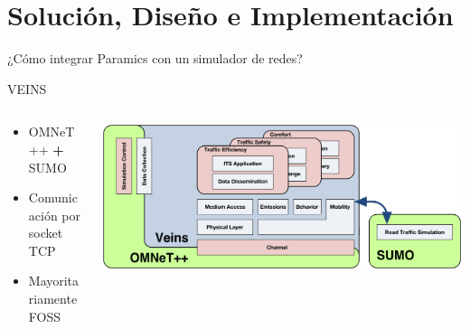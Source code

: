 \documentclass[aspectratio=169]{beamer}
\begin{document}

\section{Solución, Diseño e Implementación}
\begin{frame}[standout]
\centering
¿Cómo integrar Paramics con un simulador de redes?
\end{frame}

\begin{frame}{VEINS}
    \begin{columns}
        \begin{column}{.3\linewidth}
            \begin{itemize}
                \item OMNeT++ \textbf{+} SUMO
                \item Comunicación por socket TCP
                \item Mayoritariamente FOSS
            \end{itemize}
        \end{column}
        \begin{column}{.7\linewidth}
            \centering
            \includegraphics[width=\linewidth]{figuras/veins-arch.png}
        \end{column}
    \end{columns}
\end{frame}
\end{document}
